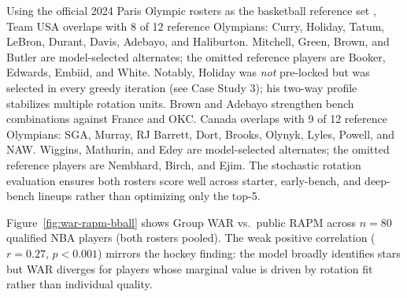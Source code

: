 \documentclass[11pt,letterpaper]{article}
\begin{document}
Using the official 2024 Paris Olympic rosters as the basketball
reference set \cite{fibaParisRosterTracker,usaBasketball2024,teamCanada2024MBB},
Team USA overlaps with 8 of 12 reference Olympians:
Curry, Holiday, Tatum, LeBron,
Durant, Davis, Adebayo, and Haliburton. Mitchell, Green, Brown, and
Butler are model-selected alternates; the omitted reference players are
Booker, Edwards, Embiid, and White. Notably, Holiday was \emph{not}
pre-locked but was selected in every greedy iteration (see Case Study
3); his two-way profile stabilizes multiple rotation units. Brown and
Adebayo strengthen bench combinations against France and OKC.
Canada overlaps with 9 of 12 reference Olympians: SGA, Murray, RJ
Barrett, Dort, Brooks, Olynyk, Lyles, Powell, and NAW. Wiggins,
Mathurin, and Edey are model-selected alternates; the omitted reference
players are Nembhard, Birch, and Ejim. The stochastic rotation
evaluation ensures both rosters score well across starter, early-bench,
and deep-bench lineups rather than optimizing only the top-5.

Figure~\ref{fig:war-rapm-bball} shows Group WAR vs.\ public RAPM
across $n = 80$ qualified NBA players (both rosters pooled). The
weak positive correlation ($r = 0.27$, $p < 0.001$) mirrors the
hockey finding: the model broadly identifies stars but WAR diverges
for players whose marginal value is driven by rotation fit rather than
individual quality.
\end{document}

